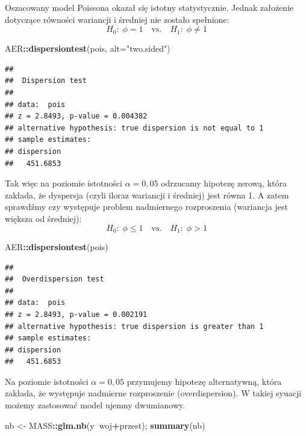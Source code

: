 \documentclass[polish,]{book}
\newenvironment{Shaded}{\begin{snugshade}}{\end{snugshade}}
\newcommand{\DataTypeTok}[1]{\textcolor[rgb]{0.13,0.29,0.53}{#1}}
\newcommand{\KeywordTok}[1]{\textcolor[rgb]{0.13,0.29,0.53}{\textbf{#1}}}
\newcommand{\NormalTok}[1]{#1}
\newcommand{\OperatorTok}[1]{\textcolor[rgb]{0.81,0.36,0.00}{\textbf{#1}}}
\newcommand{\StringTok}[1]{\textcolor[rgb]{0.31,0.60,0.02}{#1}}
\begin{document}
Oszacowany model Poissona okazał się istotny statystycznie. Jednak założenie dotyczące równości wariancji i średniej nie zostało spełnione:
\[
H_0:\;\phi=1\quad\mbox{vs.}\quad H_1:\;\phi\neq 1
\]

\begin{Shaded}
\begin{Highlighting}[]
\NormalTok{AER}\OperatorTok{::}\KeywordTok{dispersiontest}\NormalTok{(pois, }\DataTypeTok{alt=}\StringTok{"two.sided"}\NormalTok{)}
\end{Highlighting}
\end{Shaded}

\begin{verbatim}
## 
##  Dispersion test
## 
## data:  pois
## z = 2.8493, p-value = 0.004382
## alternative hypothesis: true dispersion is not equal to 1
## sample estimates:
## dispersion 
##   451.6853
\end{verbatim}

Tak więc na poziomie istotności \(\alpha = 0,05\) odrzucamy hipotezę zerową, która zakłada, że dyspersja (czyli iloraz wariancji i średniej) jest równa 1. A zatem sprawdźmy czy występuje problem nadmiernego rozproszenia (wariancja jest większa od średniej):
\[
H_0:\;\phi\leq1\quad\mbox{vs.}\quad H_1:\;\phi> 1
\]

\begin{Shaded}
\begin{Highlighting}[]
\NormalTok{AER}\OperatorTok{::}\KeywordTok{dispersiontest}\NormalTok{(pois)}
\end{Highlighting}
\end{Shaded}

\begin{verbatim}
## 
##  Overdispersion test
## 
## data:  pois
## z = 2.8493, p-value = 0.002191
## alternative hypothesis: true dispersion is greater than 1
## sample estimates:
## dispersion 
##   451.6853
\end{verbatim}

Na poziomie istotności \(\alpha = 0,05\) przymujemy hipotezę alternatywną, która zakłada, że występuje nadmierne rozproszenie (overdispersion). W takiej syuacji możemy zastosować model ujemny dwumianowy.

\begin{Shaded}
\begin{Highlighting}[]
\NormalTok{nb <-}\StringTok{ }\NormalTok{MASS}\OperatorTok{::}\KeywordTok{glm.nb}\NormalTok{(y}\OperatorTok{~}\NormalTok{woj}\OperatorTok{+}\NormalTok{przest); }\KeywordTok{summary}\NormalTok{(nb)}
\end{Highlighting}
\end{Shaded}
\end{document}
